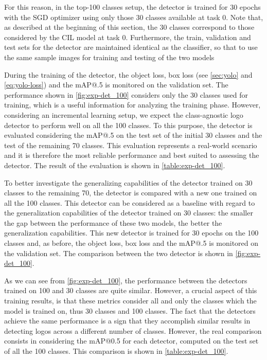 For this reason, in the top-100 classes setup, the detector is trained for 30 epochs with the SGD optimizer using only those 30 classes available at task 0.
Note that, as described at the beginning of this section, the 30 classes correspond to those considered by the CIL model at task 0. Furthermore, the train, validation and test sets  for the detector are maintained identical as the classifier, so that to use the same sample images for training and testing of the two models

During the training of the detector, the object loss, box loss (see \autoref{sec:yolo} and \autoref{eq:yolo-loss}) and the mAP@.5 is monitored on the validation set. The performance shown in \autoref{fig:exp-det_100} considers only the 30 classes used for training, which is a useful information for analyzing the training phase. However, considering an incremental learning setup, we expect the class-agnostic logo detector to perform well on all the 100 classes.
To this purpose, the detector is evaluated considering the mAP@.5 on the test set of the initial 30 classes and the test of the remaining 70 classes.
This evaluation represents a real-world scenario and it is therefore the most reliable performance and best suited to assessing the detector.
The result of the evaluation is shown in \autoref{table:exp-det_100}.

To better investigate the generalizing capabilities of the detector trained on 30 classes to the remaining 70, the detector is compared with a new one trained on all the 100 classes.
This detector can be considered as a baseline with regard to the generalization capabilities of the detector trained on 30 classes: the smaller the gap between the performance of these two models, the better the generalization capabilities.
This new detector is trained for 30 epochs on the 100 classes and, as before, the object loss, box loss and the mAP@.5 is monitored on the validation set. The comparison between the two detector is shown in \autoref{fig:exp-det_100}.

As we can see from \autoref{fig:exp-det_100}, the performance between the detectors trained on 100 and 30 classes are quite similar. However, a crucial aspect of this training results, is that these metrics consider all and only the classes which the model is trained on, thus 30 classes and 100 classes.
The fact that the detectors achieve the same performance is a sign that they accomplish similar results in detecting logos across a different number of classes.
However, the real comparison consists in considering the mAP@0.5 for each detector, computed on the test set of all the 100 classes. This comparison is shown in \autoref{table:exp-det_100}.

